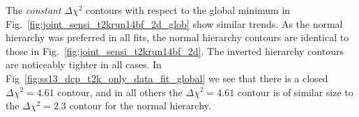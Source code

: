 The \emph{constant} $\Delta \chi^2$ contours with respect to the global minimum in Fig.~\ref{fig:joint_sensi_t2krun14bf_2d_glob} show similar trends. 
As the normal hierarchy was preferred in all fits, the normal hierarchy contours are identical to those in Fig.~\ref{fig:joint_sensi_t2krun14bf_2d}. 
The inverted hierarchy contours are noticeably tighter in all cases. 
In Fig~\ref{fig:ss13_dcp_t2k_only_data_fit_global} we see that there is a closed $\Delta \chi^2=4.61$ contour, 
and in all others the $\Delta \chi^2=4.61$ contour is of similar size to the $\Delta \chi^2=2.3$ contour for the normal hierarchy. 

%

